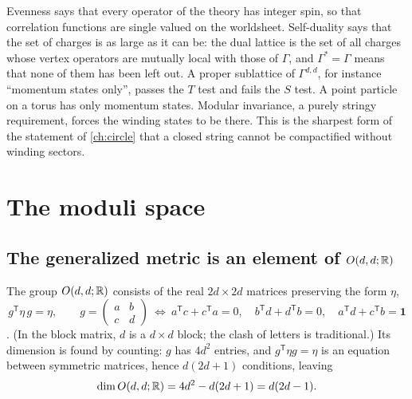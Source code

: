 \begin{physicsbox}
Evenness says that every operator of the theory has integer spin, so that correlation
functions are single valued on the worldsheet. Self-duality says that the set of charges is
as large as it can be: the dual lattice is the set of all charges whose vertex operators are
mutually local with those of $\Gamma$, and $\Gamma^*=\Gamma$ means that none of them has
been left out. A proper sublattice of $\Gamma^{d,d}$, for instance ``momentum states only'',
passes the $T$ test and fails the $S$ test. A point particle on a torus has only momentum
states. Modular invariance, a purely stringy requirement, forces the winding states to be
there. This is the sharpest form of the statement of \cref{ch:circle} that a closed string
cannot be compactified without winding sectors.
\end{physicsbox}

\section{The moduli space}\label{sec:narain:moduli}

\subsection{The generalized metric is an element of \texorpdfstring{$O(d,d;\mathbb{R})$}{O(d,d;R)}}

The group $O(d,d;\mathbb{R})$ consists of the real $2d\times2d$ matrices
preserving the form $\eta$,
\begin{equation}\label{eq:narain:odd}
 g^{\mathsf T}\eta\,g=\eta,\qquad g=\begin{pmatrix}a&b\\c&d\end{pmatrix}
 \ \Longleftrightarrow\
 a^{\mathsf T}c+c^{\mathsf T}a=0,\quad b^{\mathsf T}d+d^{\mathsf T}b=0,\quad a^{\mathsf T}d+c^{\mathsf T}b=\mathbf 1
\end{equation}
. (In the block matrix, $d$ is a
$d\times d$ block; the clash of letters is traditional.) Its dimension is found by counting:
$g$ has $4d^2$ entries, and $g^{\mathsf T}\eta g=\eta$ is an equation between symmetric matrices,
hence $d(2d+1)$ conditions, leaving
\begin{equation}
 \dim O(d,d;\mathbb{R})=4d^2-d(2d+1)=d(2d-1).
\end{equation}

